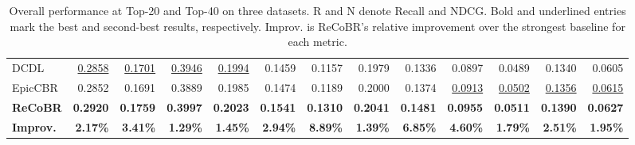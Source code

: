 \documentclass[letterpaper]{article}
\begin{document}
\begin{table}[!t]
{\begin{tabular}{@{}lrrrrrrrrrrrr@{}}
        DCDL
        & \underline{0.2858} & \underline{0.1701} & \underline{0.3946} & \underline{0.1994}
        & 0.1459 & 0.1157 & 0.1979 & 0.1336
        & 0.0897 & 0.0489 & 0.1340 & 0.0605 \\

        EpicCBR
        & 0.2852 & 0.1691 & 0.3889 & 0.1985
        & 0.1474 & 0.1189 & 0.2000 & 0.1374
        & \underline{0.0913} & \underline{0.0502} & \underline{0.1356} & \underline{0.0615} \\

        \midrule
        \textbf{ReCoBR}
        & \textbf{0.2920} & \textbf{0.1759} & \textbf{0.3997} & \textbf{0.2023}
        & \textbf{0.1541} & \textbf{0.1310} & \textbf{0.2041} & \textbf{0.1481}
        & \textbf{0.0955} & \textbf{0.0511} & \textbf{0.1390} & \textbf{0.0627} \\

        \midrule
        \textbf{Improv.}
        & \textbf{2.17\%} & \textbf{3.41\%} & \textbf{1.29\%} & \textbf{1.45\%}
        & \textbf{2.94\%} & \textbf{8.89\%} & \textbf{1.39\%} & \textbf{6.85\%}
        & \textbf{4.60\%} & \textbf{1.79\%} & \textbf{2.51\%} & \textbf{1.95\%} \\
        \bottomrule
    \end{tabular}
    }

    \caption{Overall performance at Top-20 and Top-40 on three
    datasets. R and N denote Recall and NDCG. Bold and underlined
    entries mark the best and second-best results, respectively.
    Improv. is ReCoBR's relative improvement over the strongest
    baseline for each metric.}
    \label{tab:overall}
\end{table}
\end{document}
